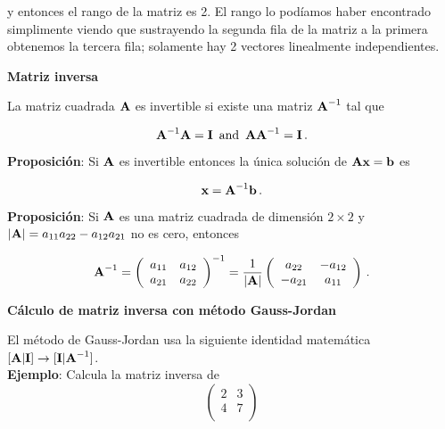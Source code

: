 \documentclass[
]{agujournal2019}
\begin{document}
y entonces el rango de la matriz es 2. El rango lo podíamos haber
encontrado simplimente viendo que sustrayendo la segunda fila de la
matriz a la primera obtenemos la tercera fila; solamente hay 2 vectores
linealmente independientes.

\vspace{0.5cm}

\textbf{Matriz inversa}

La matriz cuadrada \({\textbf A}\) es invertible si existe una matriz
\({\textbf A}^{-1}\) tal que

\[{\textbf A}^{-1}{\textbf A}={\textbf I}\,\,\,{\rm and}\,\,\,{\textbf A}{\textbf A}^{-1}={\textbf I}\,.\]

\vspace{0.5cm}

\textbf{Proposición}: Si \({\textbf A}\) es invertible entonces la única
solución de \({\textbf A}{\textbf x}={\textbf b}\) es

\[{\textbf x}={\textbf A}^{-1}{\textbf b}\,.\]

\vspace{0.5cm}

\textbf{Proposición}: Si \({\textbf A}\) es una matriz cuadrada de
dimensión \(2\times 2\) y \(|{\textbf A}|=a_{11}a_{22} - a_{12}a_{21}\)
no es cero, entonces

\[{\textbf A}^{-1}=\left(\begin{array}{cc}
  a_{11} & a_{12} \\
  a_{21} & a_{22} \\
\end{array}
  \right)^{-1} =
  \frac{1}{|{\textbf A}|}
  \left(\begin{array}{cc}
  a_{22} & -a_{12} \\
  -a_{21} & a_{11} \\
\end{array}
  \right)
\,.\]

\vspace{0.5cm}

\textbf{Cálculo de matriz inversa con método Gauss-Jordan}

El método de Gauss-Jordan usa la siguiente identidad matemática
\([{\textbf A}|{\textbf I}]\rightarrow [{\textbf I}|{\textbf A}^{-1}]\).\\

\textbf{Ejemplo}: Calcula la matriz inversa de \[\left(\begin{array}{cc}
  2 & 3 \\
  4 & 7 \\
\end{array}
  \right)\]
\end{document}
